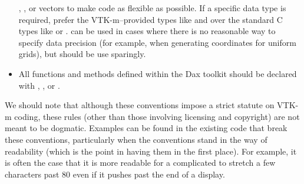 \begin{itemize}
  , , or vectors to make code as flexible
  as possible. If a specific data type is required, prefer the
  VTK-m--provided types like  and  over the
  standard C types like  or
  .  can be used in cases where there
  is no reasonable way to specify data precision (for example, when
  generating coordinates for uniform grids), but should be use sparingly.
\item All functions and methods defined within the Dax toolkit should be
  declared with \vtkmcontexport, \vtkmexecexport, or \vtkmexeccontexport.
\end{itemize}

We should note that although these conventions impose a strict statute on
VTK-m coding, these rules (other than those involving licensing and
copyright) are not meant to be dogmatic. Examples can be found in the
existing code that break these conventions, particularly when the
conventions stand in the way of readability (which is the point in having
them in the first place). For example, it is often the case that it is more
readable for a complicated  to stretch a few characters
past 80 even if it pushes past the end of a display.
